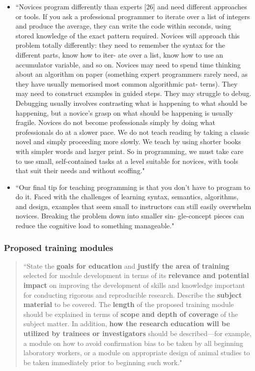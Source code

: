 \documentclass[pdftex,english,11pt,parskip=half]{scrartcl}
\begin{document}
\begin{itemize}
\item ``Novices program differently than experts [26] and need different approaches or tools. If you ask a professional programmer to iterate over a list of integers and produce the average, they can write the code within seconds, using stored knowledge of the exact pattern required. Novices will approach this problem totally differently: they need to remember the syntax for the different parts, know how to iter- ate over a list, know how to use an accumulator variable, and so on.
Novices may need to spend time thinking about an algorithm on paper (something expert programmers rarely need, as they have usually memorised most common algorithmic pat- terns). They may need to construct examples in guided steps. They may struggle to debug. Debugging usually involves contrasting what is happening to what should be happening, but a novice’s grasp on what should be happening is usually fragile.
Novices do not become professionals simply by doing what professionals do at a slower pace. We do not teach reading by taking a classic novel and simply proceeding more slowly. We teach by using shorter books with simpler words and larger print. So in programming, we must take care to use small, self-contained tasks at a level suitable for novices, with tools that suit their needs and without scoffing." \cite{brown2018ten}
\item ``Our final tip for teaching programming is that you don’t have to program to do it. Faced with the challenges of learning syntax, semantics, algorithms, and design, examples that seem small to instructors can still easily overwhelm novices. Breaking the problem down into smaller sin- gle-concept pieces can reduce the cognitive load to something manageable." \cite{brown2018ten}
\end{itemize}

\subsubsection*{Proposed training modules}

\begin{quotation} ``State the \textbf{goals for education} and \textbf{justify
the area of training} selected for module development in terms of its
\textbf{relevance and potential impact} on improving the development of skills
and knowledge important for conducting rigorous and reproducible research.
Describe the \textbf{subject material} to be covered. The \textbf{length} of the
proposed training module should be explained in terms of \textbf{scope and depth
of coverage} of the subject matter.  In addition, \textbf{how the research
education will be utilized by trainees or investigators} should be
described---for example, a module on how to avoid confirmation bias to be taken
by all beginning laboratory workers, or a module on appropriate design of animal
studies to be taken immediately prior to beginning such work." \end{quotation}
\end{document}
